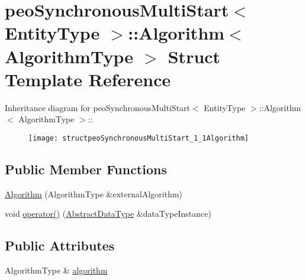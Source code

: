 \hypertarget{structpeoSynchronousMultiStart_1_1Algorithm}{
\section{peo\-Synchronous\-Multi\-Start$<$ Entity\-Type $>$::Algorithm$<$ Algorithm\-Type $>$ Struct Template Reference}
\label{structpeoSynchronousMultiStart_1_1Algorithm}
}
Inheritance diagram for peo\-Synchronous\-Multi\-Start$<$ Entity\-Type $>$::Algorithm$<$ Algorithm\-Type $>$::\begin{figure}[H]
\begin{center}
\leavevmode
\texttt{[image: structpeoSynchronousMultiStart\_1\_1Algorithm]}
\end{center}
\end{figure}
\subsection*{Public Member Functions}
\begin{CompactItemize}
\item 
\hypertarget{structpeoSynchronousMultiStart_1_1Algorithm_8ba4ac2674ca61a8e6b0af2e8e25ba66}{
\hyperlink{structpeoSynchronousMultiStart_1_1Algorithm_8ba4ac2674ca61a8e6b0af2e8e25ba66}{Algorithm} (Algorithm\-Type \&external\-Algorithm)}
\label{structpeoSynchronousMultiStart_1_1Algorithm_8ba4ac2674ca61a8e6b0af2e8e25ba66}

\item 
\hypertarget{structpeoSynchronousMultiStart_1_1Algorithm_d8902e501b61a8d5727589a5a106bb10}{
void \hyperlink{structpeoSynchronousMultiStart_1_1Algorithm_d8902e501b61a8d5727589a5a106bb10}{operator()} (\hyperlink{structpeoSynchronousMultiStart_1_1AbstractDataType}{Abstract\-Data\-Type} \&data\-Type\-Instance)}
\label{structpeoSynchronousMultiStart_1_1Algorithm_d8902e501b61a8d5727589a5a106bb10}

\end{CompactItemize}
\subsection*{Public Attributes}
\begin{CompactItemize}
\item 
\hypertarget{structpeoSynchronousMultiStart_1_1Algorithm_2d533c96d2eefea51a72d241d39abf22}{
Algorithm\-Type \& \hyperlink{structpeoSynchronousMultiStart_1_1Algorithm_2d533c96d2eefea51a72d241d39abf22}{algorithm}}
\label{structpeoSynchronousMultiStart_1_1Algorithm_2d533c96d2eefea51a72d241d39abf22}

\end{CompactItemize}



